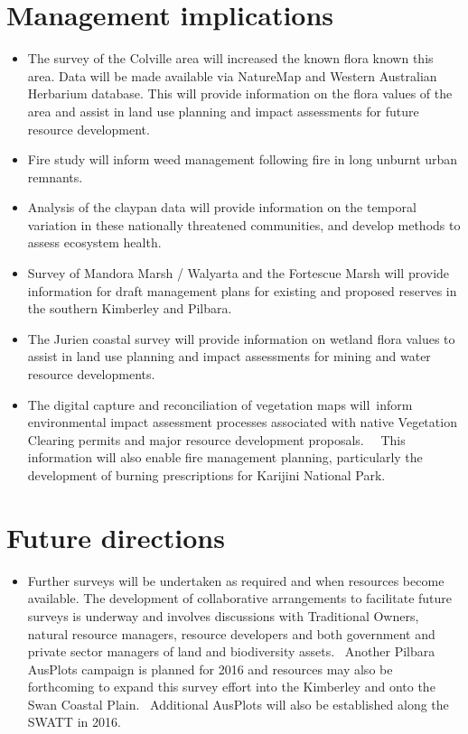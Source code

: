 \documentclass[version=last,
    paper=a4, %
    10pt, %
    usenames,
    dvipsnames,
    oneside, %
    headings=openany, %
    DIV=15 %
]{scrbook}
\begin{document}
\section*{Management implications}
\begin{itemize}
\itemsep1pt\parskip0pt
\item
  The survey of the Colville area will increased the known flora known
  this area. Data will be made available via NatureMap and Western
  Australian Herbarium database. This will provide information on the
  flora values of the area and assist in land use planning and impact
  assessments for future resource development.
\item
  Fire study will inform weed management following fire in long unburnt
  urban remnants.
\item
  Analysis of the claypan data will provide information on the temporal
  variation in these nationally threatened communities, and develop
  methods to assess ecosystem health.
\item
  Survey of Mandora Marsh / Walyarta and the Fortescue Marsh will
  provide information for draft management plans for existing and
  proposed reserves in the southern Kimberley and Pilbara.
\item
  The Jurien coastal survey will provide information on wetland flora
  values to assist in land use planning and impact assessments for
  mining and water resource developments.
\item
  The digital capture and reconciliation of vegetation maps will~inform
  environmental impact assessment processes associated with native
  Vegetation Clearing permits and major resource development
  proposals.~~ This information will also enable fire management
  planning, particularly the development of burning prescriptions for
  Karijini National Park.
\end{itemize}



\section*{Future directions}
\begin{itemize}
\itemsep1pt\parskip0pt
\item
  Further surveys will be undertaken as required and when resources
  become available. The development of collaborative arrangements to
  facilitate future surveys is underway and involves discussions with
  Traditional Owners, natural resource managers, resource developers and
  both government and private sector managers of land and biodiversity
  assets.~ Another Pilbara AusPlots campaign is planned for 2016 and
  resources may also be forthcoming to expand this survey effort into
  the Kimberley and onto the Swan Coastal Plain.~ Additional AusPlots
  will also be established along the SWATT in 2016.
\end{itemize}



\end{document}
